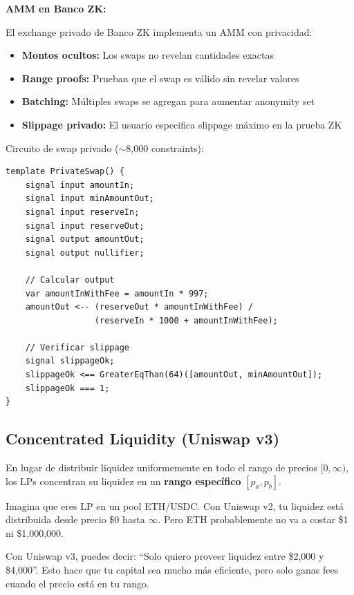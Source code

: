 \documentclass[11pt,a4paper,twoside]{book}
\begin{document}
\begin{bancozk}
\textbf{AMM en Banco ZK:}

El exchange privado de Banco ZK implementa un AMM con privacidad:
\begin{itemize}
    \item \textbf{Montos ocultos:} Los swaps no revelan cantidades exactas
    \item \textbf{Range proofs:} Prueban que el swap es v\'alido sin revelar valores
    \item \textbf{Batching:} M\'ultiples swaps se agregan para aumentar anonymity set
    \item \textbf{Slippage privado:} El usuario especifica slippage m\'aximo en la prueba ZK
\end{itemize}

Circuito de swap privado ($\sim$8,000 constraints):
\begin{verbatim}
template PrivateSwap() {
    signal input amountIn;
    signal input minAmountOut;
    signal input reserveIn;
    signal input reserveOut;
    signal output amountOut;
    signal output nullifier;
    
    // Calcular output
    var amountInWithFee = amountIn * 997;
    amountOut <-- (reserveOut * amountInWithFee) / 
                  (reserveIn * 1000 + amountInWithFee);
    
    // Verificar slippage
    signal slippageOk;
    slippageOk <== GreaterEqThan(64)([amountOut, minAmountOut]);
    slippageOk === 1;
}
\end{verbatim}
\end{bancozk}

\subsection{Concentrated Liquidity (Uniswap v3)}

\begin{definition}
En lugar de distribuir liquidez uniformemente en todo el rango de precios $[0, \infty)$, los LPs concentran su liquidez en un \textbf{rango espec\'ifico} $[p_a, p_b]$.
\end{definition}

\begin{intuicion}
Imagina que eres LP en un pool ETH/USDC. Con Uniswap v2, tu liquidez est\'a distribuida desde precio \$0 hasta $\infty$. Pero ETH probablemente no va a costar \$1 ni \$1,000,000.

Con Uniswap v3, puedes decir: ``Solo quiero proveer liquidez entre \$2,000 y \$4,000''. Esto hace que tu capital sea mucho m\'as eficiente, pero solo ganas fees cuando el precio est\'a en tu rango.
\end{intuicion}
\end{document}
